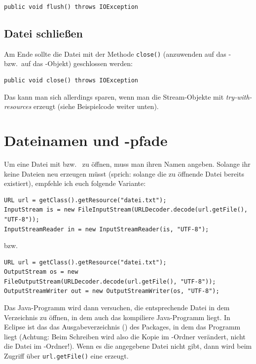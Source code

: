 \begin{lstlisting}
public void flush() throws IOException
\end{lstlisting}

\subsection{Datei schließen}

Am Ende sollte die Datei mit der Methode \lstinline|close()| (anzuwenden auf das
- bzw.\ auf das
-Objekt) geschlossen werden:

\begin{lstlisting}
public void close() throws IOException
\end{lstlisting}

Das kann man sich allerdings sparen, wenn man die Stream-Objekte mit
\emph{try-with-resources} erzeugt (siehe Beispielcode weiter unten).

\section{Dateinamen und -pfade}

Um eine Datei mit  bzw.\  zu
öffnen, muss man ihren Namen angeben. Solange ihr keine Dateien neu erzeugen
müsst (sprich: solange die zu öffnende Datei bereits existiert), empfehle ich
euch folgende Variante:

\begin{lstlisting}
URL url = getClass().getResource("datei.txt");
InputStream is = new FileInputStream(URLDecoder.decode(url.getFile(), "UTF-8"));
InputStreamReader in = new InputStreamReader(is, "UTF-8");
\end{lstlisting}

bzw.

\begin{lstlisting}
URL url = getClass().getResource("datei.txt");
OutputStream os = new FileOutputStream(URLDecoder.decode(url.getFile(), "UTF-8"));
OutputStreamWriter out = new OutputStreamWriter(os, "UTF-8");
\end{lstlisting}

Das Java-Programm wird dann versuchen, die entsprechende Datei in dem
Verzeichnis zu öffnen, in dem auch das kompiliere Java-Programm liegt. In
Eclipse ist das das Ausgabeverzeichnis () des Packages, in
dem das Programm liegt (Achtung: Beim Schreiben wird also die Kopie im
-Ordner verändert, nicht die Datei im -Ordner!). Wenn
es die angegebene Datei nicht gibt, dann wird beim Zugriff über
\lstinline|url.getFile()| eine  erzeugt.

